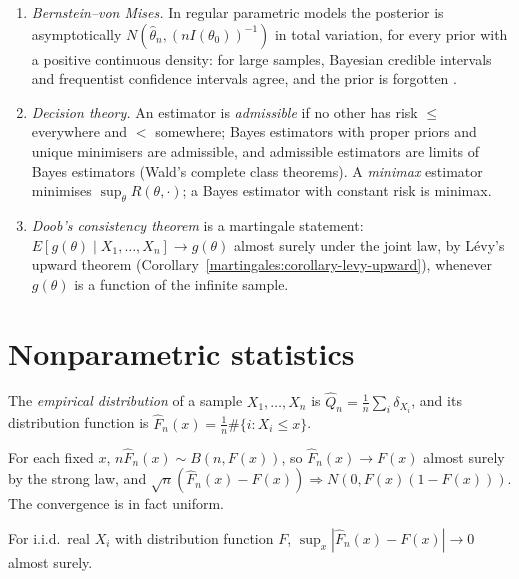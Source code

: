\begin{remark}\label{statistics:remark-bayes}
\begin{enumerate}
\item \emph{Bernstein--von Mises.} In regular parametric models the posterior is asymptotically $N(\hat\theta_n, (nI(\theta_0))^{-1})$ in total variation, for every prior with a positive continuous density: for large samples,
Bayesian credible intervals and frequentist confidence intervals agree, and the prior is forgotten \cite{van-der-vaart}.
\item \emph{Decision theory.} An estimator is \emph{admissible} if no other has risk $\leq$ everywhere and $<$ somewhere; Bayes estimators with proper priors and unique minimisers are admissible, and admissible estimators are
limits of Bayes estimators (Wald's complete class theorems). A \emph{minimax} estimator minimises $\sup_\theta R(\theta, \cdot)$; a Bayes estimator with constant risk is minimax.
\item \emph{Doob's consistency theorem} is a martingale statement: $E[g(\theta) \mid X_1, \ldots, X_n] \to g(\theta)$ almost surely under the joint law, by L\'evy's upward theorem (Corollary~\ref{martingales:corollary-levy-upward}), whenever
$g(\theta)$ is a function of the infinite sample.
\end{enumerate}
\end{remark}

\section{Nonparametric statistics}\label{statistics:section-nonparametric}

\begin{definition}\label{statistics:definition-empirical}
The \emph{empirical distribution} of a sample $X_1, \ldots, X_n$ is $\hat Q_n = \frac1n\sum_i\delta_{X_i}$, and its distribution function is $\hat F_n(x) = \frac1n\#\{i : X_i \leq x\}$.
\end{definition}

For each fixed $x$, $n\hat F_n(x) \sim B(n, F(x))$, so $\hat F_n(x) \to F(x)$ almost surely by the strong law, and $\sqrt n(\hat F_n(x) - F(x)) \Rightarrow N(0, F(x)(1 - F(x)))$. The convergence is in fact uniform.

\begin{theorem}\label{statistics:theorem-glivenko-cantelli}
For i.i.d.\ real $X_i$ with distribution function $F$, $\sup_x|\hat F_n(x) - F(x)| \to 0$ almost surely.
\end{theorem}

